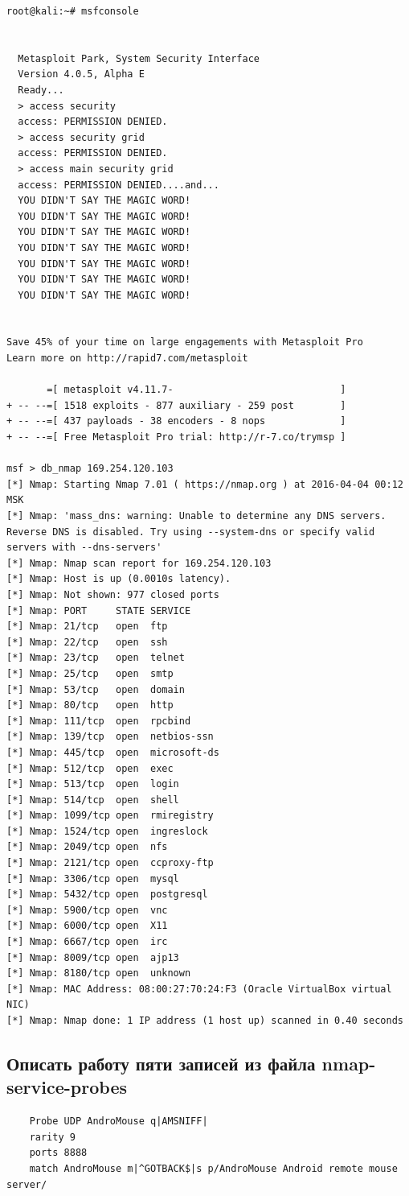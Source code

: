 \documentclass[10pt,a4paper]{report}
\begin{document}
		\begin{verbatim}
root@kali:~# msfconsole
                                                  

  Metasploit Park, System Security Interface
  Version 4.0.5, Alpha E
  Ready...
  > access security
  access: PERMISSION DENIED.
  > access security grid
  access: PERMISSION DENIED.
  > access main security grid
  access: PERMISSION DENIED....and...
  YOU DIDN'T SAY THE MAGIC WORD!
  YOU DIDN'T SAY THE MAGIC WORD!
  YOU DIDN'T SAY THE MAGIC WORD!
  YOU DIDN'T SAY THE MAGIC WORD!
  YOU DIDN'T SAY THE MAGIC WORD!
  YOU DIDN'T SAY THE MAGIC WORD!
  YOU DIDN'T SAY THE MAGIC WORD!


Save 45% of your time on large engagements with Metasploit Pro
Learn more on http://rapid7.com/metasploit

       =[ metasploit v4.11.7-                             ]
+ -- --=[ 1518 exploits - 877 auxiliary - 259 post        ]
+ -- --=[ 437 payloads - 38 encoders - 8 nops             ]
+ -- --=[ Free Metasploit Pro trial: http://r-7.co/trymsp ]

msf > db_nmap 169.254.120.103
[*] Nmap: Starting Nmap 7.01 ( https://nmap.org ) at 2016-04-04 00:12 MSK
[*] Nmap: 'mass_dns: warning: Unable to determine any DNS servers. Reverse DNS is disabled. Try using --system-dns or specify valid servers with --dns-servers'
[*] Nmap: Nmap scan report for 169.254.120.103
[*] Nmap: Host is up (0.0010s latency).
[*] Nmap: Not shown: 977 closed ports
[*] Nmap: PORT     STATE SERVICE
[*] Nmap: 21/tcp   open  ftp
[*] Nmap: 22/tcp   open  ssh
[*] Nmap: 23/tcp   open  telnet
[*] Nmap: 25/tcp   open  smtp
[*] Nmap: 53/tcp   open  domain
[*] Nmap: 80/tcp   open  http
[*] Nmap: 111/tcp  open  rpcbind
[*] Nmap: 139/tcp  open  netbios-ssn
[*] Nmap: 445/tcp  open  microsoft-ds
[*] Nmap: 512/tcp  open  exec
[*] Nmap: 513/tcp  open  login
[*] Nmap: 514/tcp  open  shell
[*] Nmap: 1099/tcp open  rmiregistry
[*] Nmap: 1524/tcp open  ingreslock
[*] Nmap: 2049/tcp open  nfs
[*] Nmap: 2121/tcp open  ccproxy-ftp
[*] Nmap: 3306/tcp open  mysql
[*] Nmap: 5432/tcp open  postgresql
[*] Nmap: 5900/tcp open  vnc
[*] Nmap: 6000/tcp open  X11
[*] Nmap: 6667/tcp open  irc
[*] Nmap: 8009/tcp open  ajp13
[*] Nmap: 8180/tcp open  unknown
[*] Nmap: MAC Address: 08:00:27:70:24:F3 (Oracle VirtualBox virtual NIC)
[*] Nmap: Nmap done: 1 IP address (1 host up) scanned in 0.40 seconds

		\end{verbatim}
	\subsection{Описать работу пяти записей из файла nmap-service-probes}
	\begin{verbatim}	
	Probe UDP AndroMouse q|AMSNIFF|
	rarity 9
	ports 8888
	match AndroMouse m|^GOTBACK$|s p/AndroMouse Android remote mouse server/
	\end{verbatim}	
	
\end{document}
